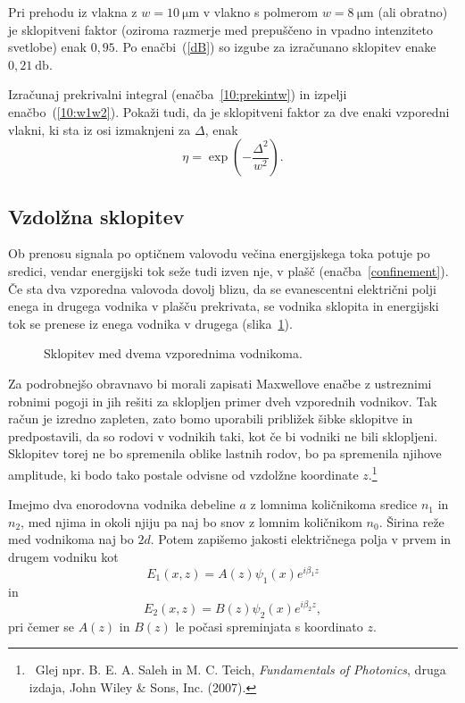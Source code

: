 Pri prehodu iz vlakna z $w = 10~\si{\micro\meter}$ v vlakno
s polmerom $w = 8~\si{\micro\meter}$ (ali obratno) je sklopitveni faktor (oziroma
razmerje med prepuščeno in vpadno intenziteto svetlobe) enak $0,95$. Po enačbi~(\ref{dB})
so izgube za izračunano sklopitev enake $0,21~\si{\decibel}$. 

\begin{definition}
Izračunaj prekrivalni integral (enačba~\ref{10:prekintw}) in izpelji enačbo~(\ref{10:w1w2}).
Pokaži tudi, da je sklopitveni faktor za dve enaki vzporedni vlakni, ki sta iz osi izmaknjeni
za $\Delta$, enak
\begin{equation}
\eta = \exp \left( - \frac{\Delta^2}{w^2}\right)\!.
\end{equation}

\end{definition}
\subsection*{Vzdolžna sklopitev}
Ob prenosu signala po optičnem valovodu večina energijskega toka potuje po sredici,
vendar energijski tok seže tudi izven nje, v plašč (enačba~\ref{confinement}). 
Če sta dva vzporedna valovoda dovolj blizu, da
se evanescentni električni polji enega in drugega vodnika v plašču prekrivata, se vodnika 
sklopita in energijski tok se prenese iz enega vodnika v drugega 
(slika~\ref{fig:fcoupler}). 
\begin{figure}[ht]
\centering
\def\svgwidth{90truemm} 
 
\caption{Sklopitev med dvema vzporednima vodnikoma.}
\label{fig:fcoupler}
\end{figure}

Za podrobnejšo obravnavo bi morali zapisati Maxwellove enačbe z ustreznimi robnimi pogoji 
in jih rešiti za sklopljen primer dveh vzporednih vodnikov. Tak račun je izredno zapleten, 
zato bomo uporabili približek šibke sklopitve in predpostavili, da so rodovi v vodnikih taki, 
kot če bi vodniki ne bili sklopljeni.
Sklopitev torej ne bo spremenila oblike lastnih rodov, bo pa spremenila njihove amplitude, ki 
bodo tako postale odvisne od vzdolžne koordinate $z$.\footnote{~Glej npr. B. E. A. Saleh in M. C. Teich, 
{\it Fundamentals of Photonics}, druga izdaja, John Wiley \& Sons, Inc. (2007).}

Imejmo dva enorodovna vodnika debeline $a$ z lomnima količnikoma sredice $n_1$ in $n_2$, 
med njima in okoli njiju pa naj bo snov z lomnim količnikom $n_0$. Širina 
reže med vodnikoma naj bo $2d$.
Potem zapišemo jakosti električnega polja v prvem in drugem vodniku kot
\begin{equation}
E_1(x,z) = A(z) \psi_1(x) e^{i \beta_1 z}
\end{equation}
in
\begin{equation}
E_2(x,z) = B(z) \psi_2(x) e^{i \beta_2 z},
\end{equation}
pri čemer se $A(z)$ in $B(z)$ le počasi spreminjata s koordinato $z$.

